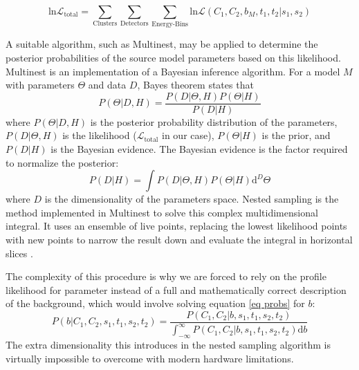 \documentclass{report}
\begin{document}
\begin{equation} \label{total log likelihood}
  \text{ln}\mathcal{L}_{\text{total}} = \sum_{\text{Clusters}}\sum_{\text{Detectors}}\sum_{\text{Energy-Bins}} \text{ln}\mathcal{L}(C_1, C_2, b_M, t_1, t_2 \vert s_1, s_2)
\end{equation}

A suitable algorithm, such as Multinest, \cite{Feroz_2019} may be applied to determine the posterior probabilities of the source model parameters based on this likelihood.
Multinest is an implementation of a Bayesian inference algorithm. For a model $M$ with parameters $\Theta$ and data $D$, Bayes theorem states that
\begin{equation}
  P(\Theta\vert D, H) = \frac{P(D\vert \Theta, H)P(\Theta\vert H)}{P(D\vert H)}
\end{equation}
where $P(\Theta\vert D, H)$ is the posterior probability distribution of the parameters, $P(D\vert \Theta, H)$ is the likelihood ($\mathcal{L}_{\text{total}}$ in our case), $P(\Theta\vert H)$ is the prior, and $P(D\vert H)$ is the Bayesian evidence. The Bayesian evidence is the factor required to normalize the posterior:
\begin{equation}
  P(D\vert H) = \int P(D\vert \Theta, H) P(\Theta\vert H) \text{d}^D \Theta
\end{equation}
where $D$ is the dimensionality of the parameters space. Nested sampling is the method implemented in Multinest to solve this complex multidimensional integral. It uses an ensemble of live points, replacing the lowest likelihood points with new points to narrow the result down and evaluate the integral in horizontal slices \cite{Feroz_2019}.

The complexity of this procedure is why we are forced to rely on the profile likelihood for parameter instead of a full and mathematically correct description of the background, which would involve solving equation \ref{eq probs} for $b$:
\begin{equation}
  P(b \vert C_1, C_2, s_1, t_1, s_2, t_2) = \frac{P(C_1, C_2 \vert b, s_1, t_1, s_2, t_2)}{\int_{-\infty}^{\infty} P(C_1, C_2 \vert b, s_1, t_1, s_2, t_2) \text{d}b}
\end{equation}
The extra dimensionality this introduces in the nested sampling algorithm is virtually impossible to overcome with modern hardware limitations.
\end{document}
